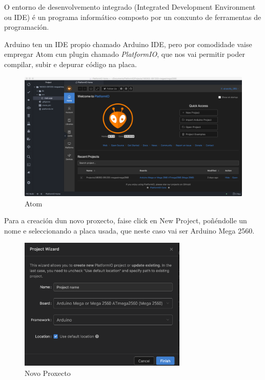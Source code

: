 \documentclass[11pt,twoside]{book}
\begin{document}
O entorno de desenvolvemento integrado (Integrated Development Environment ou IDE) é un programa informático composto por un conxunto de ferramentas de programación. 

Arduino ten un IDE propio chamado Arduino IDE, pero por comodidade vaise empregar Atom cun plugin chamado \textit{PlatformIO}, que nos vai permitir poder compilar, subir e depurar código na placa.

\begin{figure}[H]
	\begin{center}
		\includegraphics[width=15cm]{images/Atom.png}
	\end{center}
	\caption{Atom}
	\label{fig:Atom}
\end{figure}

Para a creación dun novo proxecto, faise click en New Project, poñéndolle un nome e seleccionando a placa usada, que neste caso vai ser Arduino Mega 2560.

\begin{figure}[H]
	\begin{center}
		\includegraphics[width=8cm]{images/NewProject.png}
	\end{center}
	\caption{Novo Proxecto}
	\label{fig:NewProject}
\end{figure}
\end{document}
